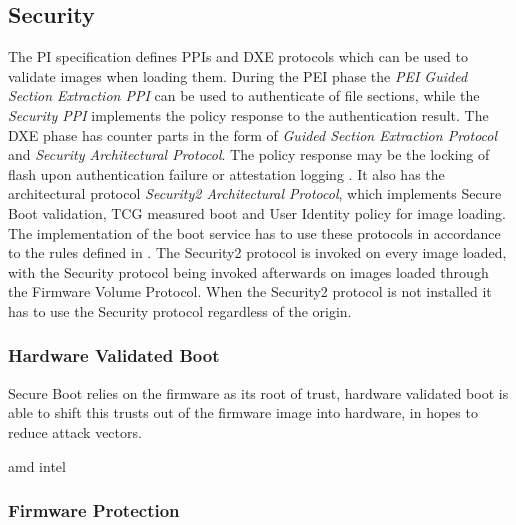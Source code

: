 
\subsection{Security}
\label{sec:uefi-pi:pi:security}

The \ac{PI} specification defines \acp{PPI} and \ac{DXE} protocols which can be used to validate images when loading them.
During the \ac{PEI} phase the \emph{\ac{PEI} Guided Section Extraction \ac{PPI}} can be used to authenticate of file sections, while the \emph{Security \ac{PPI}} implements the policy response to the authentication result.
The \ac{DXE} phase has counter parts in the form of \emph{Guided Section Extraction Protocol} and \emph{Security Architectural Protocol}.
The policy response may be the locking of flash upon authentication failure or attestation logging \cite[Vol. 2, Section 12.9.1]{pi-spec}.
It also has the architectural protocol \emph{Security2 Architectural Protocol}, which implements Secure Boot validation, \ac{TCG} measured boot and User Identity policy for image loading.
The implementation of the boot service  has to use these protocols in accordance to the rules defined in \cite[Vol. 2, Section 12.9.2]{pi-spec}.
The Security2 protocol is invoked on every image loaded, with the Security protocol being invoked afterwards on images loaded through the Firmware Volume Protocol.
When the Security2 protocol is not installed it has to use the Security protocol regardless of the origin.


\subsubsection{Hardware Validated Boot}


Secure Boot relies on the firmware as its root of trust, hardware validated boot is able to shift this trusts out of the firmware image into hardware, in hopes to reduce attack vectors.


amd
intel

\subsubsection{Firmware Protection}

